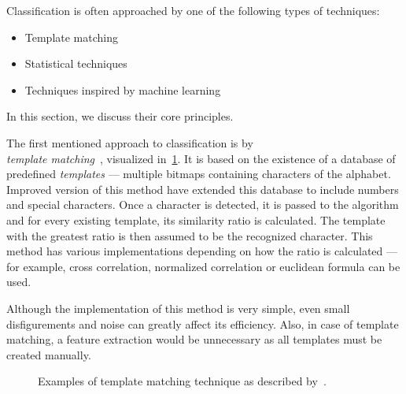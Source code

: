 Classification is often approached by one of the following types of techniques:
\begin{itemize}
    \item Template matching
    \item Statistical techniques
    \item Techniques inspired by machine learning
\end{itemize}

In this section, we discuss their core principles.

The first mentioned approach to classification is by\\ \emph{template matching}~\citep{templateMatching}, visualized in~\cref{fig:characterClassTemplate}. It is based on the existence of a database of predefined \emph{templates} --- multiple bitmaps containing characters of the alphabet. Improved version of this method have extended this database to include numbers and special characters. Once a character is detected, it is passed to the algorithm and for every existing template, its similarity ratio is calculated. The template with the greatest ratio is then assumed to be the recognized character. This method has various implementations depending on how the ratio is calculated --- for example, cross correlation, normalized correlation or euclidean formula can be used.

Although the implementation of this method is very simple, even small disfigurements and noise can greatly affect its efficiency. Also, in case of template matching, a feature extraction would be unnecessary as all templates must be created manually.

\begin{figure}[t]
    \noindent
	\caption{Examples of template matching technique as described by~\citet{Ning1993AnIO}.}
	\label{fig:characterClassTemplate}
\end{figure}

